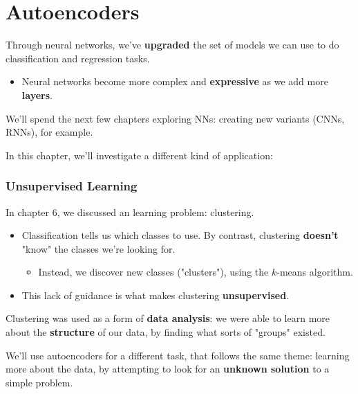 \setcounter{chapter}{8-1}

\chapter{Autoencoders}

    Through neural networks, we've \textbf{upgraded} the set of models we can use to do classification and regression tasks.

    \begin{itemize}
        \item Neural networks become more complex and \textbf{expressive} as we add more \textbf{layers}.
    \end{itemize}

    We'll spend the next few chapters exploring NNs: creating new variants (CNNs, RNNs), for example.
    
    In this chapter, we'll investigate a different kind of application: 

    \subsection{Unsupervised Learning}

        In chapter 6, we discussed an  learning problem: clustering.

        \begin{itemize}
            \item Classification tells us which classes to use. By contrast, clustering \textbf{doesn't} "know" the classes we're looking for.

            \begin{itemize}
                \item Instead, we discover new classes ("clusters"), using the $k$-means algorithm.
            \end{itemize}
            
            \item This lack of guidance is what makes clustering \textbf{unsupervised}.
        \end{itemize}

        Clustering was used as a form of \textbf{data analysis}: we were able to learn more about the \textbf{structure} of our data, by finding what sorts of "groups" existed.

        We'll use autoencoders for a different task, that follows the same theme: learning more about the data, by attempting to look for an \textbf{unknown solution} to a simple problem.

